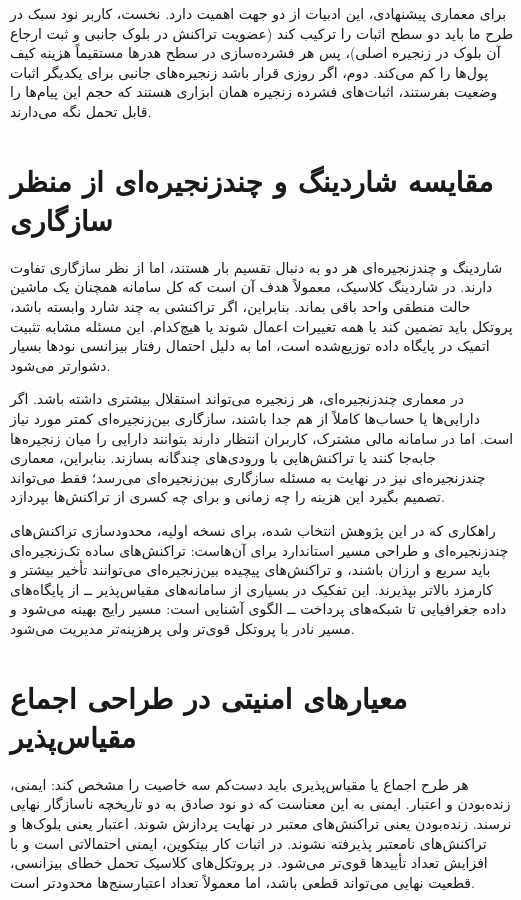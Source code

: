 برای معماری پیشنهادی، این ادبیات از دو جهت اهمیت دارد. نخست، کاربر نود سبک در طرح ما باید دو سطح اثبات را ترکیب کند (عضویت تراکنش در بلوک جانبی و ثبت ارجاع آن بلوک در زنجیره اصلی)، پس هر فشرده‌سازی در سطح هدرها مستقیماً هزینه کیف پول‌ها را کم می‌کند. دوم، اگر روزی قرار باشد زنجیره‌های جانبی برای یکدیگر اثبات وضعیت بفرستند، اثبات‌های فشرده زنجیره همان ابزاری هستند که حجم این پیام‌ها را قابل تحمل نگه می‌دارند.

\section{مقایسه شاردینگ و چندزنجیره‌ای از منظر سازگاری}

شاردینگ و چندزنجیره‌ای هر دو به دنبال تقسیم بار هستند، اما از نظر سازگاری تفاوت دارند. در شاردینگ کلاسیک، معمولاً هدف آن است که کل سامانه همچنان یک ماشین حالت منطقی واحد باقی بماند. بنابراین، اگر تراکنشی به چند شارد وابسته باشد، پروتکل باید تضمین کند یا همه تغییرات اعمال شوند یا هیچ‌کدام. این مسئله مشابه تثبیت اتمیک در پایگاه داده توزیع‌شده است، اما به دلیل احتمال رفتار بیزانسی نودها بسیار دشوارتر می‌شود.

در معماری چندزنجیره‌ای، هر زنجیره می‌تواند استقلال بیشتری داشته باشد. اگر دارایی‌ها یا حساب‌ها کاملاً از هم جدا باشند، سازگاری بین‌زنجیره‌ای کمتر مورد نیاز است. اما در سامانه مالی مشترک، کاربران انتظار دارند بتوانند دارایی را میان زنجیره‌ها جابه‌جا کنند یا تراکنش‌هایی با ورودی‌های چندگانه بسازند. بنابراین، معماری چندزنجیره‌ای نیز در نهایت به مسئله سازگاری بین‌زنجیره‌ای می‌رسد؛ فقط می‌تواند تصمیم بگیرد این هزینه را چه زمانی و برای چه کسری از تراکنش‌ها بپردازد.

راهکاری که در این پژوهش انتخاب شده، برای نسخه اولیه، محدودسازی تراکنش‌های چندزنجیره‌ای و طراحی مسیر استاندارد برای آن‌هاست: تراکنش‌های ساده تک‌زنجیره‌ای باید سریع و ارزان باشند، و تراکنش‌های پیچیده بین‌زنجیره‌ای می‌توانند تأخیر بیشتر و کارمزد بالاتر بپذیرند. این تفکیک در بسیاری از سامانه‌های مقیاس‌پذیر ــ از پایگاه‌های داده جغرافیایی تا شبکه‌های پرداخت ــ الگوی آشنایی است: مسیر رایج بهینه می‌شود و مسیر نادر با پروتکل قوی‌تر ولی پرهزینه‌تر مدیریت می‌شود.

\section{معیارهای امنیتی در طراحی اجماع مقیاس‌پذیر}

هر طرح اجماع یا مقیاس‌پذیری باید دست‌کم سه خاصیت را مشخص کند: ایمنی، زنده‌بودن و اعتبار. ایمنی به این معناست که دو نود صادق به دو تاریخچه ناسازگار نهایی نرسند. زنده‌بودن یعنی تراکنش‌های معتبر در نهایت پردازش شوند. اعتبار یعنی بلوک‌ها و تراکنش‌های نامعتبر پذیرفته نشوند. در اثبات کار بیتکوین، ایمنی احتمالاتی است و با افزایش تعداد تأییدها قوی‌تر می‌شود. در پروتکل‌های کلاسیک تحمل خطای بیزانسی، قطعیت نهایی می‌تواند قطعی باشد، اما معمولاً تعداد اعتبارسنج‌ها محدودتر است.

